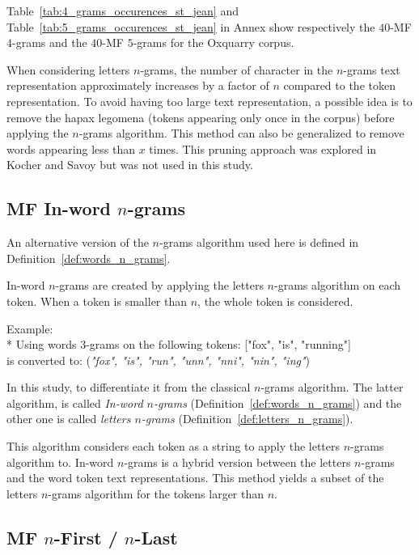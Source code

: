 Table~\ref{tab:4_grams_occurences_st_jean} and Table~\ref{tab:5_grams_occurences_st_jean} in Annex show respectively the $40$-MF $4$-grams and the $40$-MF $5$-grams for the Oxquarry corpus.

When considering letters $n$-grams, the number of character in the $n$-grams text representation approximately increases by a factor of $n$ compared to the token representation.
To avoid having too large text representation, a possible idea is to remove the hapax legomena (tokens appearing only once in the corpus) before applying the $n$-grams algorithm.
This method can also be generalized to remove words appearing less than $x$ times.
This pruning approach was explored in Kocher and Savoy \cite{kocher_linking} but was not used in this study.

\subsection{MF In-word $n$-grams}

An alternative version of the $n$-grams algorithm used here is defined in Definition~\ref{def:words_n_grams}.

\begin{definition}
  In-word $n$-grams are created by applying the letters $n$-grams algorithm on each token.
  When a token is smaller than $n$, the whole token is considered.

  Example: \\*
  Using words $3$-grams on the following tokens: ["fox", "is", "running"] \\
  is converted to: (\textit{"fox", "is", "run", "unn", "nni", "nin", "ing"})
\end{definition}

In this study, to differentiate it from the classical $n$-grams algorithm.
The latter algorithm, is called \textit{In-word $n$-grams} (Definition~\ref{def:words_n_grams}) and the other one is called \textit{letters $n$-grams} (Definition~\ref{def:letters_n_grams}).

This algorithm considers each token as a string to apply the letters $n$-grams algorithm to.
In-word $n$-grams is a hybrid version between the letters $n$-grams and the word token text representations.
This method yields a subset of the letters $n$-grams algorithm for the tokens larger than $n$.

\subsection{MF $n$-First / $n$-Last}

